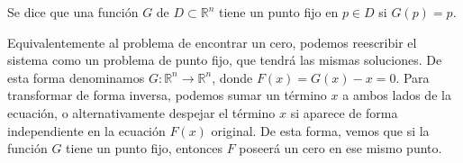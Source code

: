 \begin{definition}
	Se dice que una función $G$ de $D \subset \mathbb{R}^n$ tiene un punto fijo en $p \in D$ si $G(p) = p$.
\end{definition}

	Equivalentemente al problema de encontrar un cero, podemos reescribir el sistema como un problema de punto fijo, que tendrá las mismas soluciones. De esta forma denominamos $G:\mathbb{R}^n \longrightarrow \mathbb{R}^n$, donde $F(x) = G(x) - x = 0$. Para transformar de forma inversa, podemos sumar un término $x$ a ambos lados de la ecuación, o alternativamente despejar el término $x$ si aparece de forma independiente en la ecuación $F(x)$ original. De esta forma, vemos que si la función $G$ tiene un punto fijo, entonces $F$ poseerá un cero en ese mismo punto. \\



%

